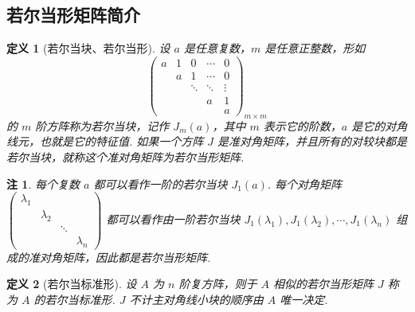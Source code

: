 \documentclass[zihao=-4,UTF8,linespread=1.8,nothm]{aytony_base}
\newtheorem{definition}{\indent 定义}[subsection]
\newtheorem*{remark}{\indent 注}
\begin{document}
\subsection{若尔当形矩阵简介}

\begin{definition}[若尔当块、若尔当形]
    设 $a$ 是任意复数，$m$ 是任意正整数，形如 $$
        \left(
        \begin{matrix}
            a & 1 & 0      & \cdots & 0      \\
              & a & 1      & \cdots & 0      \\
              &   & \ddots & \ddots & \vdots \\
              &   &        & a      & 1      \\
              &   &        &        & a
        \end{matrix}
        \right)_{m \times m}
    $$ 的 $m$ 阶方阵称为若尔当块，记作 $J_m(a)$，其中 $m$ 表示它的阶数，$a$ 是它的对角线元，也就是它的特征值. 如果一个方阵 $J$ 是准对角矩阵，并且所有的对较块都是若尔当块，就称这个准对角矩阵为若尔当形矩阵.
\end{definition}

\begin{remark}
    每个复数 $a$ 都可以看作一阶的若尔当块 $J_1(a)$. 每个对角矩阵 $\left(
        \begin{matrix}
            \lambda_1 &           &        &           \\
                      & \lambda_2 &        &           \\
                      &           & \ddots &           \\
                      &           &        & \lambda_n
        \end{matrix}
        \right)$ 都可以看作由一阶若尔当块 $J_1(\lambda_1), J_1(\lambda_2), \cdots, J_1(\lambda_n)$ 组成的准对角矩阵，因此都是若尔当形矩阵.
\end{remark}

\begin{definition}[若尔当标准形]
    设 $A$ 为 $n$ 阶复方阵，则于 $A$ 相似的若尔当形矩阵 $J$ 称为 $A$ 的若尔当标准形. $J$ 不计主对角线小块的顺序由 $A$ 唯一决定.
\end{definition}
\end{document}
